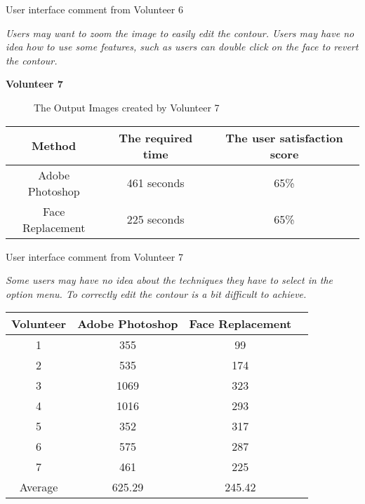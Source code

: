 \vspace{0.2in}\noindent User interface comment from Volunteer 6

\emph{Users may want to zoom the image to easily edit the contour. Users may have no idea how to use some features, such as users can double click on the face to revert the contour.}

\vspace{0.2in}\noindent \textbf{Volunteer 7}
\begin{figure}[htb]
  \centering
  \caption{The Output Images created by Volunteer 7}
  \label{fig:Result7}
\end{figure}

\begin{center}
\begin{tabular}{|c|c|c|}
  \hline
  Method & The required time & The user satisfaction score \\ \hline
  Adobe Photoshop & 461 seconds & 65\% \\ \hline
  Face Replacement & 225 seconds & 65\% \\
  \hline
\end{tabular}
\end{center}

\vspace{0.2in}\noindent User interface comment from Volunteer 7

\emph{Some users may have no idea about the techniques they have to select in the option menu. To correctly edit the contour is a bit difficult to achieve.}

\begin{center}
\begin{tabular}{|c|c|c|c|} %
\hline
Volunteer & Adobe Photoshop & Face Replacement \\ %
\hline %
1 & 355 & 99 \\ %
2 & 535 & 174 \\
3 & 1069 & 323 \\
4 & 1016 & 293 \\
5 & 352 & 317 \\
6 & 575 & 287 \\
7 & 461 & 225 \\
\hline\hline
Average & 625.29 & 245.42 \\
\hline
\end{tabular}
\end{center}

